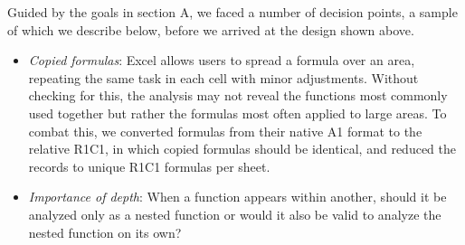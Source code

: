 \documentclass[conference]{IEEEtran}
\begin{document}
	Guided by the goals in section A, we faced a number of decision points, a
	sample of which we describe below, before we arrived at the design shown above.
	\begin{itemize} \item \textit{Copied formulas}: Excel allows users to spread a
		formula over an area, repeating the same task in each cell with minor
		adjustments. Without checking for this, the analysis may not reveal the
		functions most commonly used together but rather the formulas most often
		applied to large areas. To combat this, we converted formulas from their native
		A1 format to the relative R1C1, in which copied formulas should be identical,
		and reduced the records to unique R1C1 formulas per sheet. \item
		\textit{Importance of depth}: When a function appears within another, should it
		be analyzed only as a nested function or would it also be valid to analyze the
		nested function on its own?
		

\end{itemize}
\end{document}
